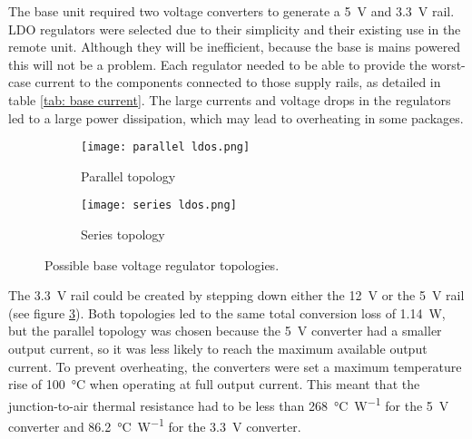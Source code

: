 The base unit required two voltage converters to generate a \SI{5}{\volt} and \SI{3.3}{\volt} rail. LDO regulators were selected due to their simplicity and their existing use in the remote unit. Although they will be inefficient, because the base is mains powered this will not be a problem. Each regulator needed to be able to provide the worst-case current to the components connected to those supply rails, as detailed in table \ref{tab: base current}. The large currents and voltage drops in the regulators led to a large power dissipation, which may lead to overheating in some packages.\\

\begin{figure}[ht]
	\centering
	\begin{subfigure}[b]{0.35\linewidth}
		\texttt{[image: parallel ldos.png]}
		\caption{Parallel topology}
		\label{fig: parallel ldos}
	\end{subfigure}
	\begin{subfigure}[b]{0.5\linewidth}
		\texttt{[image: series ldos.png]}
		\caption{Series topology}
		\label{fig: series ldos}
	\end{subfigure}
	\caption{Possible base voltage regulator topologies.}
	\label{fig: base ldos}
\end{figure}

The \SI{3.3}{\volt} rail could be created by stepping down either the \SI{12}{\volt} or the \SI{5}{\volt} rail (see figure \ref{fig: base ldos}). Both topologies led to the same total conversion loss of \SI{1.14}{\watt}, but the parallel topology was chosen because the \SI{5}{\volt} converter had a smaller output current, so it was less likely to reach the maximum available output current. To prevent overheating, the converters were set a maximum temperature rise of \SI{100}{\celsius} when operating at full output current. This meant that the junction-to-air thermal resistance had to be less than \SI{268}{\celsius\per\watt} for the \SI{5}{\volt} converter and \SI{86.2}{\celsius\per\watt} for the \SI{3.3}{\volt} converter. 

